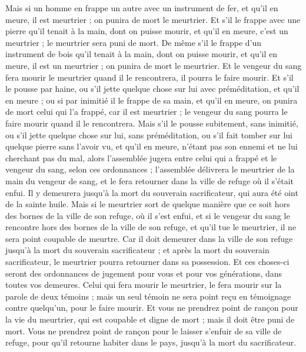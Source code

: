 \begin{multicols}{2}
Mais si un homme en frappe un autre avec un instrument de fer, et qu'il en meure, il est meurtrier ; on punira de mort le meurtrier.
Et s'il le frappe avec une pierre qu'il tenait à la main, dont on puisse mourir, et qu'il en meure, c'est un meurtrier ; le meurtrier sera puni de mort.
De même s'il le frappe d'un instrument de bois qu'il tenait à la main, dont on puisse mourir, et qu'il en meure, il est un meurtrier ; on punira de mort le meurtrier.
Et le vengeur du sang fera mourir le meurtrier quand il le rencontrera, il pourra le faire mourir.
Et s'il le pousse par haine, ou s'il jette quelque chose sur lui avec préméditation, et qu'il en meure ;
ou si par inimitié il le frappe de sa main, et qu'il en meure, on punira de mort celui qui l'a frappé, car il est meurtrier ; le vengeur du sang pourra le faire mourir quand il le rencontrera.
Mais s'il le pousse subitement, sans inimitié, ou s'il jette quelque chose sur lui, sans préméditation,
ou s'il fait tomber sur lui quelque pierre sans l'avoir vu, et qu'il en meure, n'étant pas son ennemi et ne lui cherchant pas du mal,
alors l'assemblée jugera entre celui qui a frappé et le vengeur du sang, selon ces ordonnances ;
l'assemblée délivrera le meurtrier de la main du vengeur de sang, et le fera retourner dans la ville de refuge où il s'était enfui. Il y demeurera jusqu'à la mort du souverain sacrificateur, qui aura été oint de la sainte huile.
Mais si le meurtrier sort de quelque manière que ce soit hors des bornes de la ville de son refuge, où il s'est enfui,
et si le vengeur du sang le rencontre hors des bornes de la ville de son refuge, et qu'il tue le meurtrier, il ne sera point coupable de meurtre.
Car il doit demeurer dans la ville de son refuge jusqu'à la mort du souverain sacrificateur ; et après la mort du souverain sacrificateur, le meurtrier pourra retourner dans sa possession.
Et ces choses-ci seront des ordonnances de jugement pour vous et pour vos générations, dans toutes vos demeures.
Celui qui fera mourir le meurtrier, le fera mourir sur la parole de deux témoins ; mais un seul témoin ne sera point reçu en témoignage contre quelqu'un, pour le faire mourir.
Et vous ne prendrez point de rançon pour la vie du meurtrier, qui est coupable et digne de mort ; mais il doit être puni de mort.
Vous ne prendrez point de rançon pour le laisser s'enfuir de sa ville de refuge, pour qu'il retourne habiter dans le pays, jusqu'à la mort du sacrificateur.

\end{multicols}
